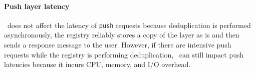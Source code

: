 %
%
%
%

\paragraph{Push layer latency}

\sysname\ does not affect the latency of
\texttt{push} requests because deduplication is performed asynchronously, \ie
the registry reliably stores a copy of the layer as is and then sends a
response message to the user.
%
However, if there are intensive push requests while the registry is performing
deduplication, \sysname\ can still impact push latencies because it incurs CPU,
memory, and I/O overhead. %

